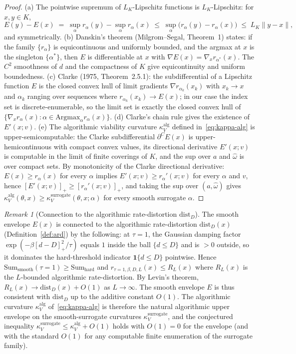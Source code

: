 \documentclass[11pt,a4paper]{article}
\theoremstyle{plain}
\theoremstyle{definition}
\theoremstyle{remark}
\newtheorem{remark}[theorem]{Remark}
\newcommand{\kk}{\kappa_{\!V}}
\newcommand{\distD}{\mathrm{dist}_{D}}
\begin{document}
\begin{proof}
(a) The pointwise supremum of $L_K$-Lipschitz functions is $L_K$-Lipschitz:
for $x, y \in K$,
\[
  E(y) - E(x) \;=\; \sup_\alpha r_\alpha(y) - \sup_\alpha r_\alpha(x)
  \;\leq\; \sup_\alpha \bigl(r_\alpha(y) - r_\alpha(x)\bigr)
  \;\leq\; L_K \|y - x\|,
\]
and symmetrically. (b) Danskin's theorem (Milgrom--Segal, Theorem~1)
states: if the family $\{r_\alpha\}$ is equicontinuous and uniformly
bounded, and the argmax at $x$ is the singleton $\{\alpha^*\}$, then $E$
is differentiable at $x$ with $\nabla E(x) = \nabla_x r_{\alpha^*}(x)$. The
$C^2$ smoothness of $d$ and the compactness of $K$ give equicontinuity
and uniform boundedness. (c) Clarke (1975, Theorem~2.5.1): the
subdifferential of a Lipschitz function $E$ is the closed convex hull
of limit gradients $\nabla r_{\alpha_k}(x_k)$ with $x_k \to x$ and
$\alpha_k$ ranging over sequences where $r_{\alpha_k}(x_k) \to E(x)$;
in our case the index set is discrete-enumerable, so the limit set is
exactly the closed convex hull of $\{\nabla_x r_\alpha(x) : \alpha \in
\mathrm{Argmax}_\alpha r_\alpha(x)\}$. (d) Clarke's chain rule gives the
existence of $E'(x; v)$. (e) The algorithmic viability curvature
$\kk^{\mathrm{alg}}$ defined in~\eqref{eq:kappa-alg} is upper-semicomputable:
the Clarke subdifferential $\partial^C E(x)$ is upper-hemicontinuous with
compact convex values, its directional derivative $E'(x; v)$ is computable
in the limit of finite coverings of $K$, and the sup over $a$ and
$\hat\omega$ is over compact sets. By monotonicity of the Clarke directional
derivative: $E(x) \geq r_\alpha(x)$ for every $\alpha$ implies
$E'(x; v) \geq r_\alpha'(x; v)$ for every $\alpha$ and $v$, hence
$[E'(x; v)]_+ \geq [r_\alpha'(x; v)]_+$, and taking the sup over $(a,
\hat\omega)$ gives $\kk^{\mathrm{alg}}(\theta, x) \geq
\kk^{\mathrm{surrogate}}(\theta, x; \alpha)$ for every smooth surrogate
$\alpha$.
\end{proof}

\begin{remark}[Connection to the algorithmic rate-distortion $\distD$]
\label{rem:envelope-distD}
The smooth envelope $E(x)$ is connected to the algorithmic rate-distortion
$\distD(x)$ (Definition~\ref{def:ard}) by the following: at $\tau = 1$,
the Gaussian damping factor $\exp(-\beta [d - D]_+^2/\tau)$ equals $1$
inside the ball $\{d \leq D\}$ and is $> 0$ outside, so it dominates the
hard-threshold indicator $\mathbf{1}\{d \leq D\}$ pointwise. Hence
$\mathrm{Sum}_{\mathrm{smooth}}(\tau = 1) \geq \mathrm{Sum}_{\mathrm{hard}}$
and $r_{\tau=1,\beta,D,L}(x) \leq R_L(x)$ where $R_L(x)$ is the
$L$-bounded algorithmic rate-distortion. By Levin's theorem, $R_L(x) \to
\distD(x) + O(1)$ as $L \to \infty$. The smooth envelope $E$ is thus
consistent with $\distD$ up to the additive constant $O(1)$. The
algorithmic curvature $\kk^{\mathrm{alg}}$ of~\eqref{eq:kappa-alg} is
therefore the natural algorithmic upper envelope on the smooth-surrogate
curvatures $\kk^{\mathrm{surrogate}}$, and the conjectured inequality
$\kk^{\mathrm{surrogate}} \leq \kk^{\mathrm{alg}} + O(1)$ holds with $O(1) = 0$
for the envelope (and with the standard $O(1)$ for any computable finite
enumeration of the surrogate family).
\end{remark}
\end{document}
